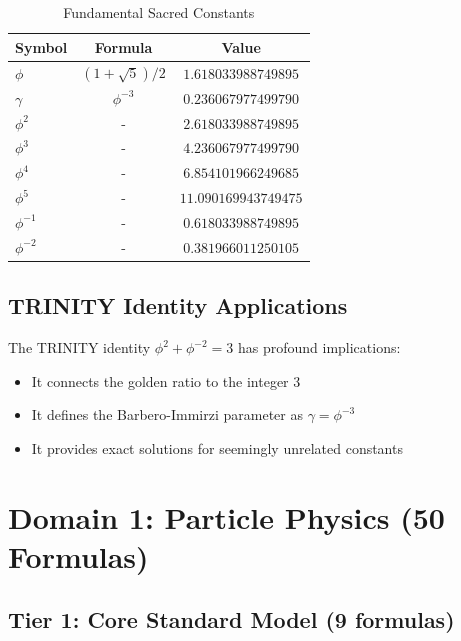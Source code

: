 \documentclass[12pt,a4paper]{article}
\begin{document}
\begin{table}[h]
\centering
\caption{Fundamental Sacred Constants}
\begin{tabular}{lcc}
\toprule
\textbf{Symbol} & \textbf{Formula} & \textbf{Value} \\
\midrule
$\phi$ & $(1+\sqrt{5})/2$ & $1.618033988749895$ \\
$\gamma$ & $\phi^{-3}$ & $0.236067977499790$ \\
$\phi^2$ & - & $2.618033988749895$ \\
$\phi^3$ & - & $4.236067977499790$ \\
$\phi^4$ & - & $6.854101966249685$ \\
$\phi^5$ & - & $11.090169943749475$ \\
$\phi^{-1}$ & - & $0.618033988749895$ \\
$\phi^{-2}$ & - & $0.381966011250105$ \\
\bottomrule
\end{tabular}
\end{table}

\subsection{TRINITY Identity Applications}

The TRINITY identity $\phi^2 + \phi^{-2} = 3$ has profound implications:
\begin{itemize}
    \item It connects the golden ratio to the integer 3
    \item It defines the Barbero-Immirzi parameter as $\gamma = \phi^{-3}$
    \item It provides exact solutions for seemingly unrelated constants
\end{itemize}

\section{Domain 1: Particle Physics (50 Formulas)}

\subsection{Tier 1: Core Standard Model (9 formulas)}
\end{document}
